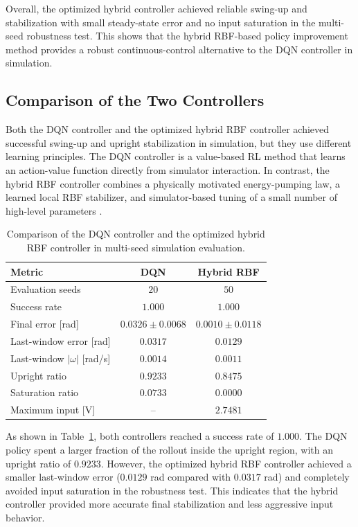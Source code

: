 Overall, the optimized hybrid controller achieved reliable swing-up and
stabilization with small steady-state error and no input saturation in the
multi-seed robustness test. This shows that the hybrid RBF-based policy
improvement method provides a robust continuous-control alternative to the DQN
controller in simulation.


\subsection{Comparison of the Two Controllers}

Both the DQN controller and the optimized hybrid RBF controller achieved
successful swing-up and upright stabilization in simulation, but they use
different learning principles. The DQN controller is a value-based RL method
that learns an action-value function directly from simulator interaction. In
contrast, the hybrid RBF controller combines a physically motivated
energy-pumping law, a learned local RBF stabilizer, and simulator-based tuning
of a small number of high-level parameters \cite{course5sc28}.

\begin{table}[htbp]
    \caption{Comparison of the DQN controller and the optimized hybrid RBF
    controller in multi-seed simulation evaluation.}
    \centering
    \begin{tabular}{lcc}
        \toprule
        Metric & DQN & Hybrid RBF \\
        \midrule
        Evaluation seeds & $20$ & $50$ \\
        Success rate & $1.000$ & $1.000$ \\
        Final error [rad] & $0.0326 \pm 0.0068$ & $0.0010 \pm 0.0118$ \\
        Last-window error [rad] & $0.0317$ & $0.0129$ \\
        Last-window $|\omega|$ [rad/s] & $0.0014$ & $0.0011$ \\
        Upright ratio & $0.9233$ & $0.8475$ \\
        Saturation ratio & $0.0733$ & $0.0000$ \\
        Maximum input [V] & -- & $2.7481$ \\
        \bottomrule
    \end{tabular}
    \label{tab:controller_comparison}
\end{table}

As shown in Table~\ref{tab:controller_comparison}, both controllers reached a
success rate of \(1.000\). The DQN policy spent a larger fraction of the rollout
inside the upright region, with an upright ratio of \(0.9233\). However, the
optimized hybrid RBF controller achieved a smaller last-window error
(\(0.0129\) rad compared with \(0.0317\) rad) and completely avoided input
saturation in the robustness test. This indicates that the hybrid controller
provided more accurate final stabilization and less aggressive input behavior.

